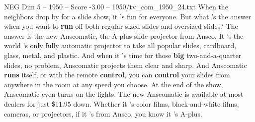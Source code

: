 \begin{textsample}{NEG Dim 5 – 1950 – Score -3.00 – 1950/tv\_com\_1950\_24.txt}  \label{ex:f5_neg_048}
When the neighbors drop by for a slide show, it 's fun for everyone.
But what 's the answer when you want to \textbf{run} off both regular-sized slides and oversized slides?
The answer is the new Anscomatic, the A-plus slide projector from Ansco.
It 's the world 's only fully automatic projector to take all popular slides, cardboard, glass, metal, and plastic.
And when it 's time for those \textbf{big} two-and-a-quarter slides, no problem, Anscomatic projects them clear and sharp.
And Anscomatic \textbf{runs} itself, or with the remote \textbf{control}, you can \textbf{control} your slides from anywhere in the room at any speed you choose.
At the end of the show, Anscomatic even turns on the lights.
The new Anscomatic is available at most dealers for just \$11.95 down.
Whether it 's color films, black-and-white films, cameras, or projectors, if it 's from Ansco, you know it 's A-plus.

\end{textsample}
